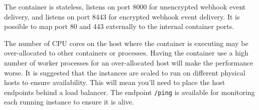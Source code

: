 The \cxoneflow container is stateless, listens on port 8000 for unencrypted webhook event delivery, 
and listens on port 8443 for encrypted webhook event delivery.  It is possible to map port 80 and 443
externally to the internal container ports.

The number of CPU cores on the host where the container is executing may be over-allocated to other
containers or processes.  Having the container use a high number of worker processes for an over-allocated
host will make the performance worse.  It is suggested that the \cxoneflow instances are scaled
to run on different physical hosts to ensure availability.  This will mean you'll need to place the
\cxoneflow host endpoints behind a load balancer.  The \cxoneflow endpoint \texttt{/ping} is available
for monitoring each running instance to ensure it is alive.



